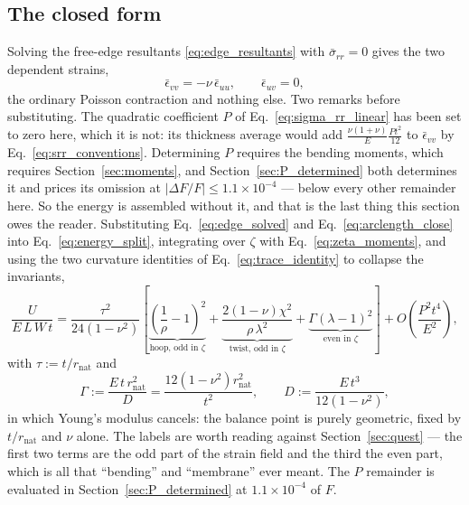 \documentclass[11pt]{article}
\begin{document}
\subsection{The closed form}\label{sec:closed_form}
Solving the free-edge resultants \eqref{eq:edge_resultants} with
$\bar\sigma_{rr}=0$ gives the two dependent strains,
\begin{equation}\label{eq:edge_solved}
    \boxed{\;\bar\epsilon_{vv} = -\nu\,\bar\epsilon_{uu},
    \qquad
    \bar\epsilon_{uv} = 0,\;}
\end{equation}
the ordinary Poisson contraction and nothing else. Two remarks before
substituting. The quadratic coefficient $P$ of
Eq.~\eqref{eq:sigma_rr_linear} has been set to zero here, which it is not: its
thickness average would add
$\frac{\nu\left(1+\nu\right)}{E}\frac{P t^{2}}{12}$ to
$\bar\epsilon_{vv}$ by Eq.~\eqref{eq:srr_conventions}. Determining $P$ requires
the bending moments, which requires Section~\ref{sec:moments}, and
Section~\ref{sec:P_determined} both determines it and prices its omission at
$\left|\Delta F/F\right| \le 1.1\times10^{-4}$ --- below every other remainder
here. So the energy is assembled without it, and that is the last thing this
section owes the reader. Substituting Eq.~\eqref{eq:edge_solved} and
Eq.~\eqref{eq:arclength_close} into Eq.~\eqref{eq:energy_split}, integrating over
$\zeta$ with Eq.~\eqref{eq:zeta_moments}, and using the two curvature identities
of Eq.~\eqref{eq:trace_identity} to collapse the invariants,
\begin{equation}\label{eq:U_closed}
    \boxed{\;\frac{U}{E\,L\,W\,t}
    = \frac{\tau^{2}}{24\left(1-\nu^{2}\right)}
      \left[
      \underbrace{\left(\frac{1}{\rho}-1\right)^{2}}_{\text{hoop, odd in }\zeta}
      + \underbrace{\frac{2\left(1-\nu\right)\chi^{2}}{\rho\,\lambda^{2}}}
        _{\text{twist, odd in }\zeta}
      + \underbrace{\Gamma\left(\lambda-1\right)^{2}}_{\text{even in }\zeta}
      \right]
      + O\!\left(\frac{P^{2}t^{4}}{E^{2}}\right),\;}
\end{equation}
with $\tau := t/r_{\mathrm{nat}}$ and
\begin{equation}\label{eq:Gamma}
    \boxed{\;\Gamma := \frac{E\,t\,r_{\mathrm{nat}}^{2}}{D}
      = \frac{12\left(1-\nu^{2}\right)r_{\mathrm{nat}}^{2}}{t^{2}},
    \qquad
    D := \frac{E\,t^{3}}{12\left(1-\nu^{2}\right)},\;}
\end{equation}
in which Young's modulus cancels: the balance point is purely geometric, fixed by
$t/r_{\mathrm{nat}}$ and $\nu$ alone. The labels are worth reading against
Section~\ref{sec:quest} --- the first two terms are the odd part of the strain
field and the third the even part, which is all that ``bending'' and ``membrane''
ever meant. The $P$ remainder is evaluated in Section~\ref{sec:P_determined} at
$1.1\times10^{-4}$ of $F$.
\end{document}
